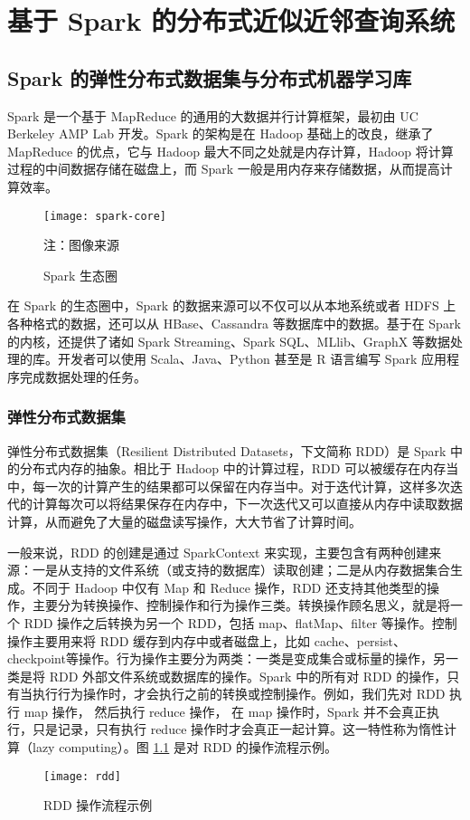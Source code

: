

\chapter{基于 Spark 的分布式近似近邻查询系统}
\label{cha:ANNS_based_on_Spark}
\section{Spark 的弹性分布式数据集与分布式机器学习库}
Spark 是一个基于 MapReduce 的通用的大数据并行计算框架，最初由 UC Berkeley AMP Lab 开发。Spark 的架构是在 Hadoop 基础上的改良，继承了 MapReduce 的优点，它与 Hadoop 最大不同之处就是内存计算，Hadoop 将计算过程的中间数据存储在磁盘上，而 Spark 一般是用内存来存储数据，从而提高计算效率。
\begin{figure}[H]
  \centering
  \texttt{[image: spark-core]}
  \caption{Spark 生态圈}
  \footnotesize 注：图像来源\protect\footnotemark
\end{figure}
在 Spark 的生态圈中，Spark 的数据来源可以不仅可以从本地系统或者 HDFS 上各种格式的数据，还可以从 HBase、Cassandra 等数据库中的数据。基于在 Spark 的内核，还提供了诸如 Spark Streaming、Spark SQL、MLlib、GraphX 等数据处理的库。开发者可以使用 Scala、Java、Python 甚至是 R 语言编写 Spark 应用程序完成数据处理的任务。
\subsection{弹性分布式数据集}
弹性分布式数据集（Resilient Distributed Datasets，下文简称 RDD）\cite{Zaharia2012}是 Spark 中的分布式内存的抽象。相比于 Hadoop 中的计算过程，RDD 可以被缓存在内存当中，每一次的计算产生的结果都可以保留在内存当中。对于迭代计算，这样多次迭代的计算每次可以将结果保存在内存中，下一次迭代又可以直接从内存中读取数据计算，从而避免了大量的磁盘读写操作，大大节省了计算时间。

一般来说，RDD 的创建是通过 SparkContext 来实现，主要包含有两种创建来源：一是从支持的文件系统（或支持的数据库）读取创建；二是从内存数据集合生成。不同于 Hadoop 中仅有 Map 和 Reduce 操作，RDD 还支持其他类型的操作，主要分为转换操作、控制操作和行为操作三类。转换操作顾名思义，就是将一个 RDD 操作之后转换为另一个 RDD，包括 map、flatMap、filter 等操作。控制操作主要用来将 RDD 缓存到内存中或者磁盘上，比如 cache、persist、checkpoint等操作。行为操作主要分为两类：一类是变成集合或标量的操作，另一类是将 RDD 外部文件系统或数据库的操作。Spark 中的所有对 RDD 的操作，只有当执行行为操作时，才会执行之前的转换或控制操作。例如，我们先对 RDD 执行 map 操作， 然后执行 reduce 操作， 在 map 操作时，Spark 并不会真正执行，只是记录，只有执行 reduce 操作时才会真正一起计算。这一特性称为惰性计算（lazy computing）。图
\ref{fig:rdd} 是对 RDD 的操作流程示例。
\begin{figure}[H]
  \centering
  \texttt{[image: rdd]}
  \caption{RDD 操作流程示例}
  \label{fig:rdd}
\end{figure}

